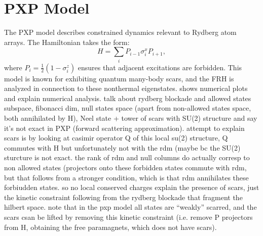 \documentclass{article}
\begin{document}
\section{PXP Model}
The PXP model describes constrained dynamics relevant to Rydberg atom arrays. The Hamiltonian takes the form:
\begin{equation}
    H = \sum_i P_{i-1} \sigma^x_i P_{i+1},
\end{equation}
where $P_i = \frac{1}{2} (1 - \sigma^z_i)$ ensures that adjacent excitations are forbidden. This model is known for exhibiting quantum many-body scars, and the FRH is analyzed in connection to these nonthermal eigenstates. shows numerical plots and explain numerical analysis. talk about rydberg blockade and allowed states subspace, fibonacci dim, null states space (apart from non-allowed states space, both annihilated by H), Neel state + tower of scars with SU(2) structure and say it's not exact in PXP (forward scattering approximation). attempt to explain scars is by looking at casimir operator Q of this local su(2) structure, Q commutes with H but unfortunately not with the rdm (maybe bc the SU(2) sturcture is not exact. the rank of rdm and null columns do actually corresp to non allowed states (projectors onto these forbidden states commute with rdm, but that follows from a stronger condition, which is that rdm annihilates these forbiudden states. so no local conserved charges explain the presence of scars, just the kinetic constraint following from the rydberg blockade that fragment the hilbert space. note that in the pxp model all states are ``weakly'' scarred, and the scars csan be lifted by removing this kinetic constraint (i.e. remove P projectors from H, obtaining the free paramagnets, which does not have scars).
\end{document}
